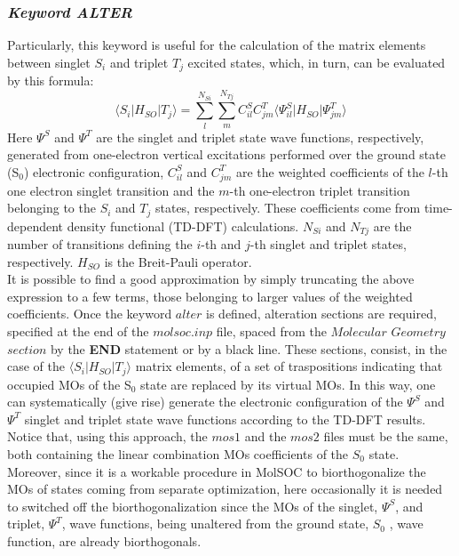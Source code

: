 \documentclass[a4paper,12pt]{article}
\newcommand{\bra}[1]{\langle #1|}
\newcommand{\ket}[1]{|#1\rangle }
\begin{document}
\subsubsection{{\em Keyword ALTER}}
Particularly, this keyword is useful for the calculation of the matrix elements between singlet $S_i$ and
triplet $T_j$ excited states, which, in turn, can be evaluated by this formula\cite{Chiod3,Chiod4}:
\begin{equation}
\bra{S_i} H_{SO} \ket{T_j} = \sum_l^{N_{Si}}\sum_m^{N_{Tj}}C_{il}^SC_{jm}^T\bra{\Psi_{il}^S} H_{SO} \ket{\Psi_{jm}^T}
\end{equation}
Here $\Psi^S$ and $\Psi^T$ are the singlet and triplet state wave functions, respectively, generated from
one-electron vertical excitations performed over the ground state (S$_0$) electronic configuration,
$C_{il}^S$ and $C_{jm}^T$ are the weighted coefficients of the $l$-th one electron singlet transition
and the $m$-th one-electron triplet transition belonging to the $S_i$ and $T_j$ states, respectively. These
coefficients come from time-dependent density functional (TD-DFT) calculations.
$N_{Si}$ and $N_{Tj}$ are the number of transitions defining the $i$-th and $j$-th singlet and triplet
states, respectively. $H_{SO}$ is the Breit-Pauli operator\cite{Breit}. \\
It is possible to find a good approximation by simply truncating the above expression to a few terms, those
belonging to larger values of the weighted coefficients.
Once the keyword $alter$ is defined, alteration sections are required,
specified at the end of the $molsoc.inp$ file, spaced from the $Molecular$ $Geometry$ $section$
by the {\bf END} statement or by a black line. These sections,
consist, in the case of the $\bra{S_i} H_{SO} \ket{T_j}$ matrix elements,
of a set of traspositions indicating that occupied
MOs of the S$_0$ state are replaced by its virtual MOs. In this way, one can systematically (give rise) generate
the electronic configuration of the $\Psi^S$ and $\Psi^T$ singlet and triplet state wave functions
according to the TD-DFT results. Notice that, using this approach, the $mos1$ and the $mos2$ files must be the
same, both containing the linear combination MOs coefficients of the $S_0$ state. Moreover, since it is a workable
procedure in {\sf MolSOC} to biorthogonalize the MOs of states coming from separate optimization, here occasionally
it is needed to switched off the biorthogonalization since the MOs of the singlet, $\Psi^S$, and triplet, $\Psi^T$,
wave functions, being unaltered from the ground state, $S_0$ , wave function, are already biorthogonals.
\end{document}
